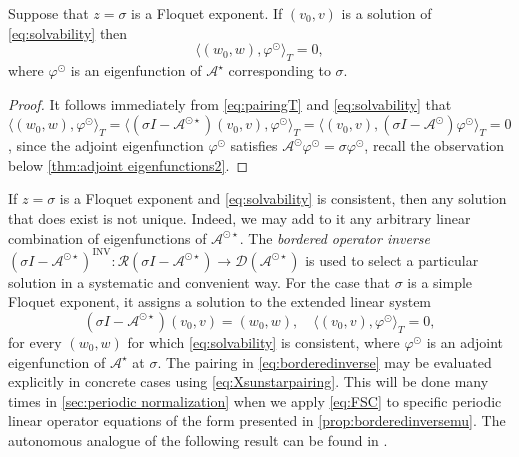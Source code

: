 \documentclass[english]{myarticle}
\DeclareMathOperator{\inv}{INV}
\begin{document}
\begin{sloppypar}
\begin{proposition} \label{prop:FSC}
Suppose that $z = \sigma$ is a Floquet exponent. If $(v_0,v)$ is a solution of \eqref{eq:solvability} then
\begin{equation} \label{eq:FSC} \tag{FSC}
    \langle (w_0,w), \varphi^\odot \rangle_T = 0,
\end{equation}
where $\varphi^\odot$ is an eigenfunction of $\mathcal{A}^\star$ corresponding to $\sigma$.
\end{proposition}
\begin{proof}
It follows immediately from \eqref{eq:pairingT} and \eqref{eq:solvability} that $\langle (w_0,w),\varphi^\odot \rangle_T = \langle (\sigma I-\mathcal{A}^{\odot \star})(v_0,v), \varphi^\odot \rangle_T = \langle (v_0,v), (\sigma I - \mathcal{A}^{\odot}) \varphi^\odot \rangle_T = 0$, since the adjoint eigenfunction $\varphi^\odot$ satisfies $\mathcal{A}^\odot \varphi^\odot = \sigma \varphi^\odot$, recall the observation below \cref{thm:adjoint eigenfunctions2}.
\end{proof}

If $z = \sigma$ is a Floquet exponent and \eqref{eq:solvability} is consistent, then any solution that does exist is not unique. Indeed, we may add to it any arbitrary linear combination of eigenfunctions of $\mathcal{A}^{\odot \star}$. The \emph{bordered operator inverse} $(\sigma I - \mathcal{A}^{\odot \star})^{\inv} : \mathcal{R}(\sigma I - \mathcal{A}^{\odot \star}) \to \mathcal{D}(\mathcal{A}^{\odot \star})$ is used to select a particular solution in a systematic and convenient way. For the case that $\sigma$ is a simple Floquet exponent, it assigns a solution to the extended linear system
\begin{equation} \label{eq:borderedinverse}
    (\sigma I - \mathcal{A}^{\odot \star}) (v_0,v) = (w_0,w), \quad \langle (v_0,v), \varphi^\odot \rangle_T = 0,
\end{equation}
for every $(w_0,w)$ for which \eqref{eq:solvability} is consistent, where $\varphi^\odot$ is an adjoint eigenfunction of $\mathcal{A}^\star$ at $\sigma$. The pairing in \eqref{eq:borderedinverse} may be evaluated explicitly in concrete cases using \eqref{eq:Xsunstarpairing}. This will be done many times in \cref{sec:periodic normalization} when we apply \eqref{eq:FSC} to specific periodic linear operator equations of the form presented in \cref{prop:borderedinversemu}. The autonomous analogue of the following result can be found in \cite[Proposition 3.6]{Janssens2010}.


\end{sloppypar}
\end{document}
